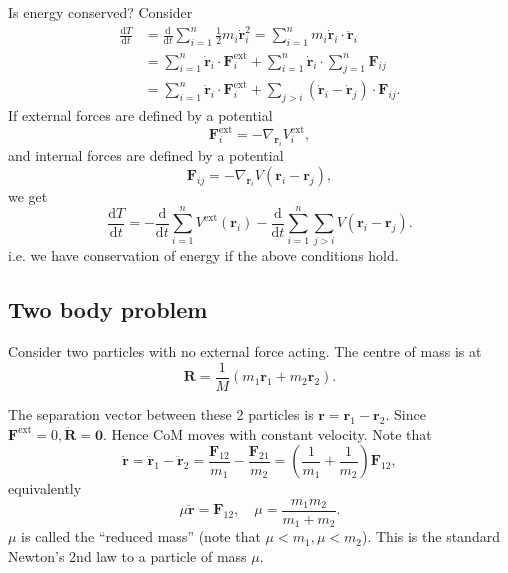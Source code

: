 Is energy conserved? Consider 
\begin{align*}
    \frac{\mathrm{d}T}{\mathrm{d}t} &= \frac{\mathrm{d}}{\mathrm{d}t}\sum_{i=1}^{n}\frac{1}{2}m_i \dot{\mathbf{r}}_i^2 = \sum_{i=1}^{n}m_i \dot{\mathbf{r}}_i \cdot \ddot{\mathbf{r}}_i\\
    &= \sum_{i=1}^{n} \dot{\mathbf{r}}_i \cdot \mathbf{F}_i^{\text{ext}}+\sum_{i=1}^{n}\dot{\mathbf{r}}_i \cdot \sum_{j=1}^{n}\mathbf{F}_{ij}\\ 
    &= \sum_{i=1}^{n} \dot{\mathbf{r}}_i \cdot \mathbf{F}_i^{\text{ext}}+ \sum_{j>i} (\dot{\mathbf{r}}_i-\dot{\mathbf{r}}_j)\cdot \mathbf{F}_{ij}.
\end{align*}
If external forces are defined by a potential 
\[
    \mathbf{F}_{i}^{\text{ext}} = - \nabla_{\mathbf{r}_i} V_i^{\text{ext}},
\]
and internal forces are defined by a potential 
\[
    \mathbf{F}_{ij} = -\nabla _{\mathbf{r}_i} V(\mathbf{r}_i-\mathbf{r}_j),
\]
we get 
\[
    \frac{\mathrm{d}T}{\mathrm{d}t} = - \frac{\mathrm{d}}{\mathrm{d}t}\sum_{i=1}^{n}V^{\text{ext}}(\mathbf{r}_i) - \frac{\mathrm{d}}{\mathrm{d}t}\sum_{i=1}^{n}\sum_{j>i} V(\mathbf{r}_i-\mathbf{r}_j).
\]
i.e. we have conservation of energy if the above conditions hold.

\subsection{Two body problem}
Consider two particles with no external force acting. The centre of mass is at 
\[
    \mathbf{R} = \frac{1}{M}(m_1\mathbf{r}_1+m_2\mathbf{r}_2).
\]
\begin{center}
\end{center}
The separation vector between these 2 particles is $ \mathbf{r}=\mathbf{r}_1-\mathbf{r}_2. $ Since $ \mathbf{F}^{\text{ext}}=0, \ddot{\mathbf{R}}=\mathbf{0} $. Hence CoM moves with constant velocity. Note that 
\[
    \ddot{\mathbf{r}} = \ddot{\mathbf{r}}_1-\ddot{\mathbf{r}}_2 = \frac{\mathbf{F}_{12}}{m_1}-\frac{\mathbf{F}_{21}}{m_2} = \left( \frac{1}{m_1}+\frac{1}{m_2} \right)\mathbf{F}_{12} ,
\]
equivalently 
\[
    \mu \ddot{\mathbf{r}} = \mathbf{F}_{12},\quad \mu = \frac{m_1m_2}{m_1+m_2}.
\]
$ \mu $ is called the ``reduced mass'' (note that $ \mu<m_1,\mu<m_2 $). This is the standard Newton's 2nd law to a particle of mass $ \mu $.

